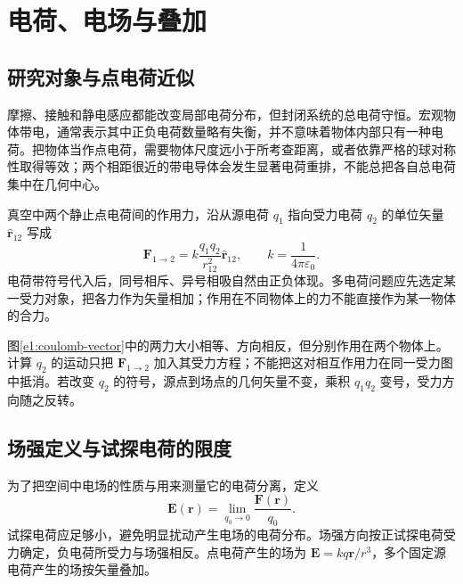 \section{电荷、电场与叠加}
\subsection{研究对象与点电荷近似}

摩擦、接触和静电感应都能改变局部电荷分布，但封闭系统的总电荷守恒。宏观物体带电，通常表示其中正负电荷数量略有失衡，并不意味着物体内部只有一种电荷。把物体当作点电荷，需要物体尺度远小于所考查距离，或者依靠严格的球对称性取得等效；两个相距很近的带电导体会发生显著电荷重排，不能总把各自总电荷集中在几何中心。

真空中两个静止点电荷间的作用力，沿从源电荷 $q_1$ 指向受力电荷 $q_2$ 的单位矢量 $\hat{\bm r}_{12}$ 写成
\[
 \bm F_{1\to2}=k\frac{q_1q_2}{r_{12}^2}\hat{\bm r}_{12},\qquad
 k=\frac1{4\pi\varepsilon_0}.
\]
电荷带符号代入后，同号相斥、异号相吸自然由正负体现。多电荷问题应先选定某一受力对象，把各力作为矢量相加；作用在不同物体上的力不能直接作为某一物体的合力。


图\ref{e1:coulomb-vector}中的两力大小相等、方向相反，但分别作用在两个物体上。计算 $q_2$ 的运动只把 $\bm F_{1\to2}$ 加入其受力方程；不能把这对相互作用力在同一受力图中抵消。若改变 $q_2$ 的符号，源点到场点的几何矢量不变，乘积 $q_1q_2$ 变号，受力方向随之反转。

\subsection{场强定义与试探电荷的限度}

为了把空间中电场的性质与用来测量它的电荷分离，定义
\[
 \bm E(\bm r)=\lim_{q_0\to0}\frac{\bm F(\bm r)}{q_0}.
\]
试探电荷应足够小，避免明显扰动产生电场的电荷分布。场强方向按正试探电荷受力确定，负电荷所受力与场强相反。点电荷产生的场为 $\bm E=kq\bm r/r^3$，多个固定源电荷产生的场按矢量叠加。

